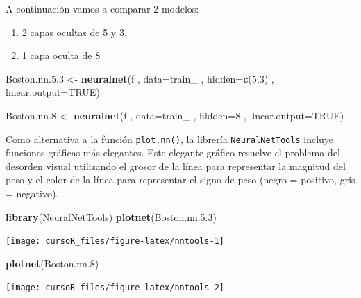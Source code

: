 \documentclass[]{book}
\newenvironment{Shaded}{\begin{snugshade}}{\end{snugshade}}
\newcommand{\KeywordTok}[1]{\textcolor[rgb]{0.13,0.29,0.53}{\textbf{#1}}}
\newcommand{\DataTypeTok}[1]{\textcolor[rgb]{0.13,0.29,0.53}{#1}}
\newcommand{\DecValTok}[1]{\textcolor[rgb]{0.00,0.00,0.81}{#1}}
\newcommand{\FloatTok}[1]{\textcolor[rgb]{0.00,0.00,0.81}{#1}}
\newcommand{\StringTok}[1]{\textcolor[rgb]{0.31,0.60,0.02}{#1}}
\newcommand{\OtherTok}[1]{\textcolor[rgb]{0.56,0.35,0.01}{#1}}
\newcommand{\NormalTok}[1]{#1}
\providecommand{\tightlist}{%
  \setlength{\itemsep}{0pt}\setlength{\parskip}{0pt}}
\begin{document}
A continuación vamos a comparar 2 modelos:

\begin{enumerate}
\def\labelenumi{\arabic{enumi}.}
\tightlist
\item
  2 capas ocultas de 5 y 3.
\item
  1 capa oculta de 8
\end{enumerate}

\begin{Shaded}
\begin{Highlighting}[]
\NormalTok{Boston.nn.}\FloatTok{5.3}\NormalTok{ <-}\StringTok{ }\KeywordTok{neuralnet}\NormalTok{(f}
\NormalTok{                , }\DataTypeTok{data=}\NormalTok{train_}
\NormalTok{                , }\DataTypeTok{hidden=}\KeywordTok{c}\NormalTok{(}\DecValTok{5}\NormalTok{,}\DecValTok{3}\NormalTok{)}
\NormalTok{                , }\DataTypeTok{linear.output=}\OtherTok{TRUE}\NormalTok{)}

\NormalTok{Boston.nn.}\DecValTok{8}\NormalTok{ <-}\StringTok{ }\KeywordTok{neuralnet}\NormalTok{(f}
\NormalTok{                , }\DataTypeTok{data=}\NormalTok{train_}
\NormalTok{                , }\DataTypeTok{hidden=}\DecValTok{8}
\NormalTok{                , }\DataTypeTok{linear.output=}\OtherTok{TRUE}\NormalTok{)}
\end{Highlighting}
\end{Shaded}

Como alternativa a la función \texttt{plot.nn()}, la librería
\texttt{NeuralNetTools} incluye funciones gráficas más elegantes. Este
elegante gráfico resuelve el problema del desorden visual utilizando el
grosor de la línea para representar la magnitud del peso y el color de
la línea para representar el signo de peso (negro = positivo, gris =
negativo).

\begin{Shaded}
\begin{Highlighting}[]
\KeywordTok{library}\NormalTok{(NeuralNetTools)}
\KeywordTok{plotnet}\NormalTok{(Boston.nn.}\FloatTok{5.3}\NormalTok{)}
\end{Highlighting}
\end{Shaded}

\begin{center}\texttt{[image: cursoR\_files/figure-latex/nntools-1]} \end{center}

\begin{Shaded}
\begin{Highlighting}[]
\KeywordTok{plotnet}\NormalTok{(Boston.nn.}\DecValTok{8}\NormalTok{)}
\end{Highlighting}
\end{Shaded}

\begin{center}\texttt{[image: cursoR\_files/figure-latex/nntools-2]} \end{center}


\end{document}
